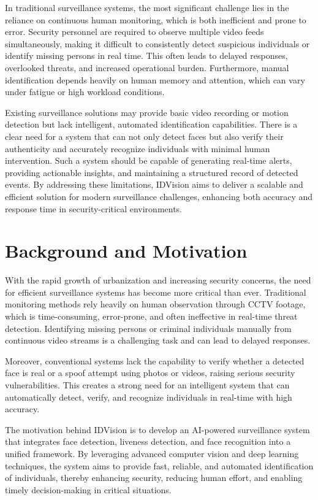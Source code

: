 \documentclass[11pt]{report}
\begin{document}
In traditional surveillance systems, the most significant challenge lies in the reliance on continuous human monitoring, which is both inefficient and prone to error. Security personnel are required to observe multiple video feeds simultaneously, making it difficult to consistently detect suspicious individuals or identify missing persons in real time. This often leads to delayed responses, overlooked threats, and increased operational burden. Furthermore, manual identification depends heavily on human memory and attention, which can vary under fatigue or high workload conditions.

Existing surveillance solutions may provide basic video recording or motion detection but lack intelligent, automated identification capabilities. There is a clear need for a system that can not only detect faces but also verify their authenticity and accurately recognize individuals with minimal human intervention. Such a system should be capable of generating real-time alerts, providing actionable insights, and maintaining a structured record of detected events. By addressing these limitations, IDVision aims to deliver a scalable and efficient solution for modern surveillance challenges, enhancing both accuracy and response time in security-critical environments.
\section{Background and Motivation}

With the rapid growth of urbanization and increasing security concerns, the need for efficient surveillance systems has become more critical than ever. Traditional monitoring methods rely heavily on human observation through CCTV footage, which is time-consuming, error-prone, and often ineffective in real-time threat detection. Identifying missing persons or criminal individuals manually from continuous video streams is a challenging task and can lead to delayed responses.

Moreover, conventional systems lack the capability to verify whether a detected face is real or a spoof attempt using photos or videos, raising serious security vulnerabilities. This creates a strong need for an intelligent system that can automatically detect, verify, and recognize individuals in real-time with high accuracy.

The motivation behind IDVision is to develop an AI-powered surveillance system that integrates face detection, liveness detection, and face recognition into a unified framework. By leveraging advanced computer vision and deep learning techniques, the system aims to provide fast, reliable, and automated identification of individuals, thereby enhancing security, reducing human effort, and enabling timely decision-making in critical situations.
\end{document}
